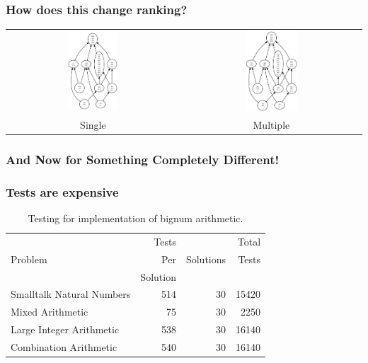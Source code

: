 \documentclass[svgnames,14pt]{beamer}
\theoremstyle{definition}
\begin{document}
\begin{frame}
\frametitle{How does this change ranking?}

\begin{center} 
\begin{tabular}{cc}
\includegraphics[width=0.3\textwidth]{rank1.ps}
&
\includegraphics[width=0.3\textwidth]{rank2.ps}\\
Single &
Multiple \\
\end{tabular}
\end{center}

\end{frame}

\begin{frame}
\frametitle{And Now for Something Completely Different!}
\end{frame}

\begin{frame}
\frametitle{Tests are expensive}
\begin{table}
\begin{tabular}{| l | r | r | r |}
\hline
 & Tests & & Total \\
Problem & Per & Solutions & Tests \\
 & Solution & &  \\
\hline
Smalltalk Natural Numbers & 514 & 30 & 15420 \\
Mixed Arithmetic & 75 & 30 & 2250 \\
Large Integer Arithmetic & 538 & 30 & 16140 \\
Combination Arithmetic & 540 & 30 & 16140 \\
\hline
\end{tabular}
\caption{Testing for implementation of bignum arithmetic.}
\end{table}
\end{frame}
\end{document}
